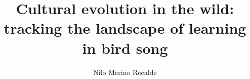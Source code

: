 \title{Cultural evolution in the wild: tracking the landscape of learning in bird song}
\author{Nilo Merino Recalde}



